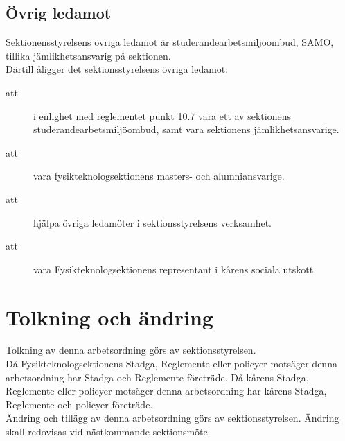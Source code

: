 \subsection{Övrig ledamot}
Sektionensstyrelsens övriga ledamot är studerandearbetsmiljöombud, SAMO, tillika jämlikhetsansvarig på sektionen.\\
Därtill åligger det sektionsstyrelsens övriga ledamot:
\begin{description}
\item[att] i enlighet med reglementet punkt 10.7 vara ett av sektionens studerandearbetsmiljöombud, samt vara sektionens jämlikhetsansvarige.
\item[att] vara fysikteknologsektionens masters- och alumniansvarige.
\item[att] hjälpa övriga ledamöter i sektionsstyrelsens verksamhet.
\item[att] vara Fysikteknologsektionens representant i kårens sociala utskott. 
\end{description}

\section{Tolkning och ändring}
Tolkning av denna arbetsordning görs av sektionsstyrelsen.\\ Då Fysikteknologsektionens Stadga, Reglemente eller policyer motsäger denna arbetsordning har Stadga och Reglemente företräde. Då kårens Stadga, Reglemente eller policyer motsäger denna arbetsordning har kårens Stadga, Reglemente och policyer företräde.\\
Ändring och tillägg av denna arbetsordning görs av sektionsstyrelsen. Ändring skall redovisas vid nästkommande sektionsmöte. 
\newpage